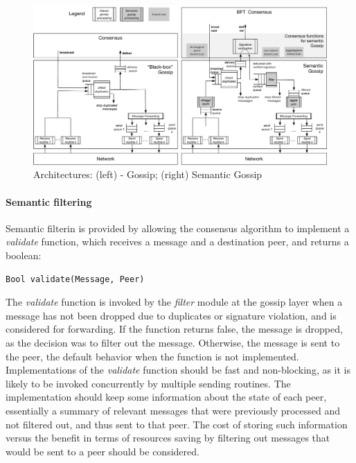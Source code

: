 \begin{figure}[htbp]
    \centering
    \includegraphics[width=1\columnwidth]{figures/architecture_SG3.pdf}

    
    \caption{Architectures: (left) - Gossip;  (right) Semantic Gossip}
    \label{fig:architecture}
    \label{fig:architecture_sg}
\vspace{-2mm}
\end{figure}


\paragraph{Semantic filtering} Semantic filterin is provided by allowing the consensus algorithm to implement
a {\em validate} function, which receives a message and a destination peer, and
returns a boolean:

\begin{verbatim}
Bool validate(Message, Peer)
\end{verbatim}

The {\em validate} function is invoked by the {\em filter} module at the gossip layer when a message has not been dropped due to duplicates or signature violation, and is considered for forwarding.
%
If the function returns false, the message is dropped, as the decision was to
filter out the message.
Otherwise, the message is sent to the peer, the default behavior when the
function is not implemented.
%
Implementations of the {\em validate} function should be fast and non-blocking,
as it is likely to be invoked concurrently by multiple sending routines.
The implementation should keep some information about the state of each peer,
essentially a summary of relevant messages that were previously processed and
not filtered out, and thus sent to that peer.
The cost of storing such information versus the benefit in terms of resources
saving by filtering out messages that would be sent to a peer
should be considered.


